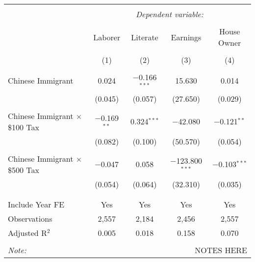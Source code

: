 
\begin{tabular}{@{\extracolsep{5pt}}lcccc} 
\\[-1.8ex]\hline 
\hline \\[-1.8ex] 
 & \multicolumn{4}{c}{\textit{Dependent variable:}} \\ 
\cline{2-5} 
\\[-1.8ex] & Laborer & Literate & Earnings & House Owner \\ 
\\[-1.8ex] & (1) & (2) & (3) & (4)\\ 
\hline \\[-1.8ex] 
 Chinese Immigrant & 0.024 & $-$0.166$^{***}$ & 15.630 & 0.014 \\ 
  & (0.045) & (0.057) & (27.650) & (0.029) \\ 
  & & & & \\ 
 Chinese Immigrant $\times$ \$100 Tax & $-$0.169$^{**}$ & 0.324$^{***}$ & $-$42.080 & $-$0.121$^{**}$ \\ 
  & (0.082) & (0.100) & (50.570) & (0.054) \\ 
  & & & & \\ 
 Chinese Immigrant $\times$ \$500 Tax & $-$0.047 & 0.058 & $-$123.800$^{***}$ & $-$0.103$^{***}$ \\ 
  & (0.054) & (0.064) & (32.310) & (0.035) \\ 
  & & & & \\ 
\hline \\[-1.8ex] 
Include Year FE & Yes & Yes & Yes & Yes \\ 
Observations & 2,557 & 2,184 & 2,456 & 2,557 \\ 
Adjusted R$^{2}$ & 0.005 & 0.018 & 0.158 & 0.070 \\ 
\hline 
\hline \\[-1.8ex] 
\textit{Note:}  & \multicolumn{4}{r}{NOTES HERE} \\ 
\end{tabular} 
